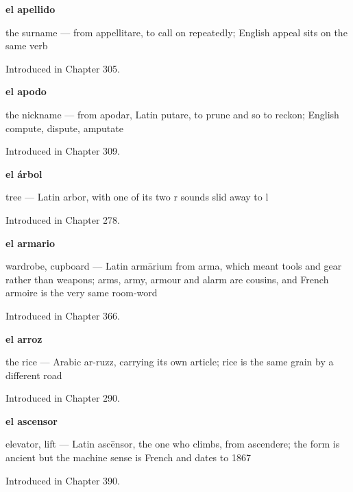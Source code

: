 \noindent\begin{minipage}[t]{\linewidth}
\raggedright
\textbf{el apellido}\par
\small the surname — from appellitare, to call on repeatedly; English appeal sits on the same verb\par
\footnotesize Introduced in Chapter 305.
\end{minipage}\par\medskip

\noindent\begin{minipage}[t]{\linewidth}
\raggedright
\textbf{el apodo}\par
\small the nickname --- from apodar, Latin putare, to prune and so to reckon; English compute, dispute, amputate\par
\footnotesize Introduced in Chapter 309.
\end{minipage}\par\medskip

\noindent\begin{minipage}[t]{\linewidth}
\raggedright
\textbf{el árbol}\par
\small tree — Latin arbor, with one of its two r sounds slid away to l\par
\footnotesize Introduced in Chapter 278.
\end{minipage}\par\medskip

\noindent\begin{minipage}[t]{\linewidth}
\raggedright
\textbf{el armario}\par
\small wardrobe, cupboard — Latin armārium from arma, which meant tools and gear rather than weapons; arms, army, armour and alarm are cousins, and French armoire is the very same room-word\par
\footnotesize Introduced in Chapter 366.
\end{minipage}\par\medskip

\noindent\begin{minipage}[t]{\linewidth}
\raggedright
\textbf{el arroz}\par
\small the rice — Arabic ar-ruzz, carrying its own article; rice is the same grain by a different road\par
\footnotesize Introduced in Chapter 290.
\end{minipage}\par\medskip

\noindent\begin{minipage}[t]{\linewidth}
\raggedright
\textbf{el ascensor}\par
\small elevator, lift — Latin ascēnsor, the one who climbs, from ascendere; the form is ancient but the machine sense is French and dates to 1867\par
\footnotesize Introduced in Chapter 390.
\end{minipage}\par\medskip

